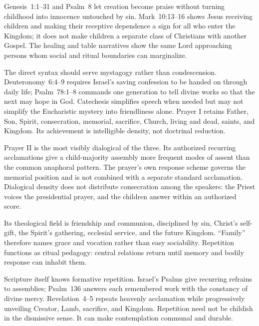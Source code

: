 Genesis~1:1--31 and Psalm~8 let creation become praise without turning childhood into innocence untouched by sin. Mark~10:13--16 shows Jesus receiving children and making their receptive dependence a sign for all who enter the Kingdom; it does not make children a separate class of Christians with another Gospel. The healing and table narratives show the same Lord approaching persons whom social and ritual boundaries can marginalize.

The direct syntax should serve mystagogy rather than condescension. Deuteronomy~6:4--9 requires Israel's saving confession to be handed on through daily life; Psalm~78:1--8 commands one generation to tell divine works so that the next may hope in God. Catechesis simplifies speech when needed but may not simplify the Eucharistic mystery into friendliness alone. Prayer I retains Father, Son, Spirit, consecration, memorial, sacrifice, Church, living and dead, saints, and Kingdom. Its achievement is intelligible density, not doctrinal reduction.


Prayer II is the most visibly dialogical of the three. Its authorized recurring acclamations give a child-majority assembly more frequent modes of assent than the common anaphoral pattern. The prayer's own response scheme governs the memorial position and is not combined with a separate standard acclamation. Dialogical density does not distribute consecration among the speakers: the Priest voices the presidential prayer, and the children answer within an authorized score.

Its theological field is friendship and communion, disciplined by sin, Christ's self-gift, the Spirit's gathering, ecclesial service, and the future Kingdom. ``Family'' therefore names grace and vocation rather than easy sociability. Repetition functions as ritual pedagogy: central relations return until memory and bodily response can inhabit them.

Scripture itself knows formative repetition. Israel's Psalms give recurring refrains to assemblies; Psalm~136 answers each remembered work with the constancy of divine mercy. Revelation~4--5 repeats heavenly acclamation while progressively unveiling Creator, Lamb, sacrifice, and Kingdom. Repetition need not be childish in the dismissive sense. It can make contemplation communal and durable.

